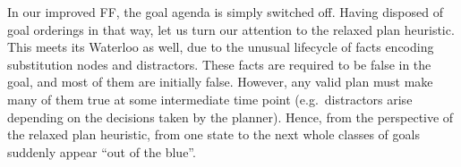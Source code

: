 












In our improved FF, the goal agenda is simply switched off. Having
disposed of goal orderings in that way, let us turn our attention to
the relaxed plan heuristic. %
This meets its Waterloo as well, due to the unusual lifecycle of facts
encoding substitution nodes and distractors. 
These facts are required to be false in the goal, and most of them are
initially false. However, any valid plan must make many of them true
at some intermediate time point (e.g.\ distractors arise depending on
the decisions taken by the planner). Hence, from the perspective of
the relaxed plan heuristic, from one state to the next whole classes
of goals suddenly appear ``out of the blue''.



